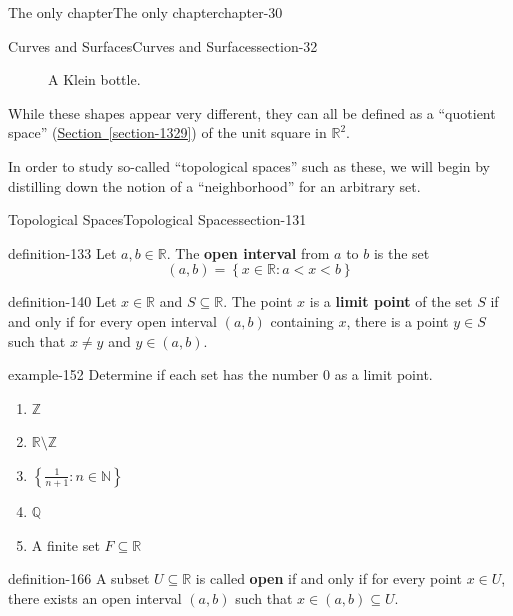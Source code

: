 \documentclass[oneside,10pt,]{book}
\newcommand{\terminology}[1]{\textbf{#1}}
\newcommand{\mb}{\mathbb}
\newcommand{\setBuilder}[2]{\left\{#1:#2\right\}}
\newcommand{\lt}{<}
\begin{document}
\begin{chapterptx}{The only chapter}{}{The only chapter}{}{}{chapter-30}
\begin{sectionptx}{Curves and Surfaces}{}{Curves and Surfaces}{}{}{section-32}
\begin{figure}
\caption{A Klein bottle.\label{figure-121}}
\end{figure}
\hypertarget{p-124}{}%
While these shapes appear very different, they can all be defined as a ``quotient space'' (\hyperref[section-1329]{Section~\ref{section-1329}}) of the unit square in \(\mathbb R^2\).%
\par
\hypertarget{p-128}{}%
In order to study so-called ``topological spaces'' such as these, we will begin by distilling down the notion of a ``neighborhood'' for an arbitrary set.%
\end{sectionptx}
%
%
\typeout{************************************************}
\typeout{************************************************}
%
\begin{sectionptx}{Topological Spaces}{}{Topological Spaces}{}{}{section-131}
\begin{definition}{}{definition-133}%
\hypertarget{p-134}{}%
Let \(a,b\in\mb R\). The \terminology{open interval} from \(a\) to \(b\) is the set%
%
\begin{equation*}
(a,b)=\setBuilder{x\in\mb R}{a\lt x\lt b}
\end{equation*}
\end{definition}
\begin{definition}{}{definition-140}%
\hypertarget{p-141}{}%
Let \(x\in\mb R\) and \(S\subseteq\mb R\). The point \(x\) is a \terminology{limit point} of the set \(S\) if and only if for every open interval \((a,b)\) containing \(x\), there is a point \(y\in S\) such that \(x\not=y\) and \(y\in(a,b)\).%
\end{definition}
\begin{example}{}{example-152}%
\hypertarget{p-153}{}%
Determine if each set has the number \(0\) as a limit point.%
\leavevmode%
\begin{enumerate}
\item\hypertarget{li-156}{}\(\mb Z\)%
\item\hypertarget{li-158}{}\(\mb R\setminus\mb Z\)%
\item\hypertarget{li-160}{}\(\setBuilder{\frac{1}{n+1}}{n\in\mb N}\)%
\item\hypertarget{li-162}{}\(\mb Q\)%
\item\hypertarget{li-164}{}A finite set \(F\subseteq\mb R\)%
\end{enumerate}
\end{example}
\begin{definition}{}{definition-166}%
\hypertarget{p-167}{}%
A subset \(U\subseteq\mb R\) is called \terminology{open} if and only if for every point \(x\in U\), there exists an open interval \((a,b)\) such that \(x\in(a,b)\subseteq U\).%

\end{definition}
\end{sectionptx}
\end{chapterptx}
\end{document}
